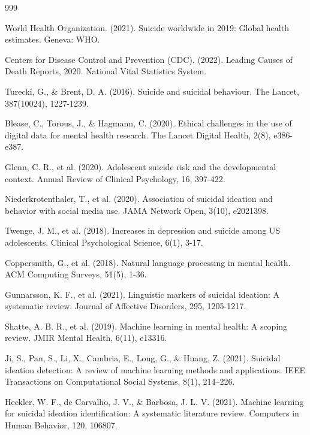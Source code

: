 \setLTRbibitems

\begin{thebibliography}{999}


\small

\singlespacing

 World Health Organization. (2021). Suicide worldwide in 2019: Global health estimates. Geneva: WHO.

 Centers for Disease Control and Prevention (CDC). (2022). Leading Causes of Death Reports, 2020. National Vital Statistics System.

 Turecki, G., \& Brent, D. A. (2016). Suicide and suicidal behaviour. The Lancet, 387(10024), 1227-1239.

 Blease, C., Torous, J., \& Hagmann, C. (2020). Ethical challenges in the use of digital data for mental health research. The Lancet Digital Health, 2(8), e386-e387.

 Glenn, C. R., et al. (2020). Adolescent suicide risk and the developmental context. Annual Review of Clinical Psychology, 16, 397-422.

 Niederkrotenthaler, T., et al. (2020). Association of suicidal ideation and behavior with social media use. JAMA Network Open, 3(10), e2021398.

 Twenge, J. M., et al. (2018). Increases in depression and suicide among US adolescents. Clinical Psychological Science, 6(1), 3-17.

 Coppersmith, G., et al. (2018). Natural language processing in mental health. ACM Computing Surveys, 51(5), 1-36.

 Gunnarsson, K. F., et al. (2021). Linguistic markers of suicidal ideation: A systematic review. Journal of Affective Disorders, 295, 1205-1217.

 Shatte, A. B. R., et al. (2019). Machine learning in mental health: A scoping review. JMIR Mental Health, 6(11), e13316.

 Ji, S., Pan, S., Li, X., Cambria, E., Long, G., \& Huang, Z. (2021). Suicidal ideation detection: A review of machine learning methods and applications. IEEE Transactions on Computational Social Systems, 8(1), 214–226.

 Heckler, W. F., de Carvalho, J. V., \& Barbosa, J. L. V. (2021). Machine learning for suicidal ideation identification: A systematic literature review. Computers in Human Behavior, 120, 106807.


\end{thebibliography}
